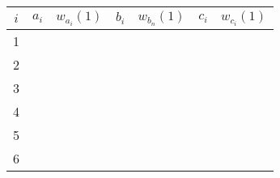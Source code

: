 \begin{enumerate}
\begin{enumerate}
		            \begin{tabular}{|c||c|c||c|c||c|c|}
			            \hline
			            $i$ & \hspace{20pt} $a_i$ \hspace{20pt} & \hspace{10pt} $w_{a_i}(1)$  \hspace{10pt} & $b_i$  \hspace{20pt} & \hspace{10pt} $w_{b_n}(1)$ \hspace{10pt} & \hspace{20pt} $c_i$  \hspace{20pt} & \hspace{10pt} $w_{c_i}(1)$ \hspace{10pt} \\ \hline
			            1   &                                   &                                           &                      &                                          &                                    &                                          \\[10pt]\hline
			            2   &                                   &                                           &                      &                                          &                                    &                                          \\[10pt]\hline
			            3   &                                   &                                           &                      &                                          &                                    &                                          \\[10pt]\hline
			            4   &                                   &                                           &                      &                                          &                                    &                                          \\[10pt]\hline
			            5   &                                   &                                           &                      &                                          &                                    &                                          \\[10pt]\hline
			            6   &                                   &                                           &                      &                                          &                                    &                                          \\[10pt]\hline

\end{tabular}
\end{enumerate}
\end{enumerate}
